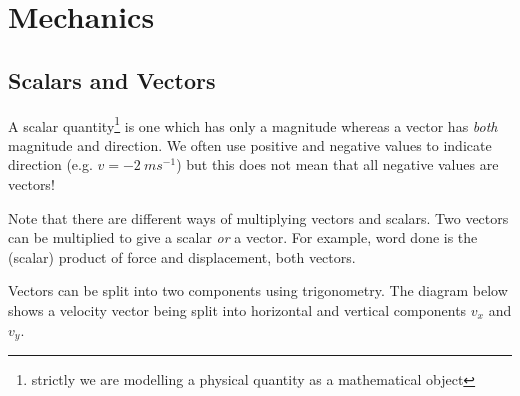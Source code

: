 \documentclass[main.tex]{subfiles}
\begin{document}
\chapter{Mechanics}
\section{Scalars and Vectors}
A scalar quantity\footnote{strictly we are modelling a physical quantity as a mathematical object} is one which has only a magnitude whereas a vector has \emph{both} magnitude and direction. We often use positive and negative values to indicate direction (e.g. $v=-2\ ms^{-1}$) but this does not mean that all negative values are vectors!

Note that there are different ways of multiplying vectors and scalars. Two vectors can be multiplied to give a scalar \emph{or} a vector. For example, word done is the (scalar) product of force and displacement, both vectors.


Vectors can be split into two components using trigonometry. The diagram below shows a velocity vector being split into horizontal and vertical components $v_x$ and $v_y$.

\begin{figure}[h]
\begin{center}
\end{center}
\end{figure}

\end{document}
